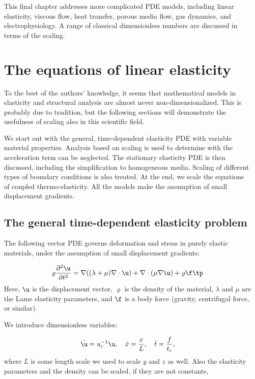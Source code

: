 \documentclass[graybox,envcountchap,sectrefs,final]{svmonodo}
\begin{document}
This final chapter addresses more complicated PDE models, including
linear elasticity, viscous flow, heat transfer, porous media flow,
gas dynamics, and electrophysiology. A range of
classical dimensionless numbers are discussed in terms of the scaling.

\section{The equations of linear elasticity}
\label{scale:elasticity}

To the best of the authors' knowledge, it seems that mathematical
models in elasticity and structural analysis are almost never
non-dimensionalized. This is probably due to tradition, but the
following sections will demonstrate the usefulness of scaling also in
this scientific field.

We start out with the general, time-dependent elasticity PDE with
variable material properties. Analysis based on scaling is used to
determine with the acceleration term can be neglected. The stationary
elasticity PDE is then discussed, including the simplification to
homogeneous media. Scaling of different types of boundary conditions is
also treated.  At the end, we scale the equations of coupled
thermo-elasticity. All the models make the assumption of small
displacement gradients.

\subsection{The general time-dependent elasticity problem}
\label{scale:elasticity:timedep}

The following vector PDE governs deformation and stress in purely elastic
materials, under the assumption of small displacement gradients:

\begin{equation}
\varrho\frac{\partial^2\u}{\partial t^2} =
\nabla ((\lambda + \mu)\nabla\cdot\u) + \nabla\cdot(\mu\nabla\u) +
\varrho\f\tp
\label{scale:elasticity:PDE1}
\end{equation}
Here, $\u$ is the displacement vector,
$\varrho$ is the density of the material, $\lambda$ and $\mu$ are
the Lame elasticity parameters, and $\f$ is a body force (gravity,
centrifugal force, or similar).

We introduce dimensionless variables:

\[ \bar\u = u_c^{-1}\u,\quad \bar x = \frac{x}{L},\quad \bar t = \frac{f}{t_c},\]
where $L$ is some length scale we used to scale $y$ and $z$ as well.
Also the elasticity parameters and the density can be scaled, if they
are not constants,
\end{document}
